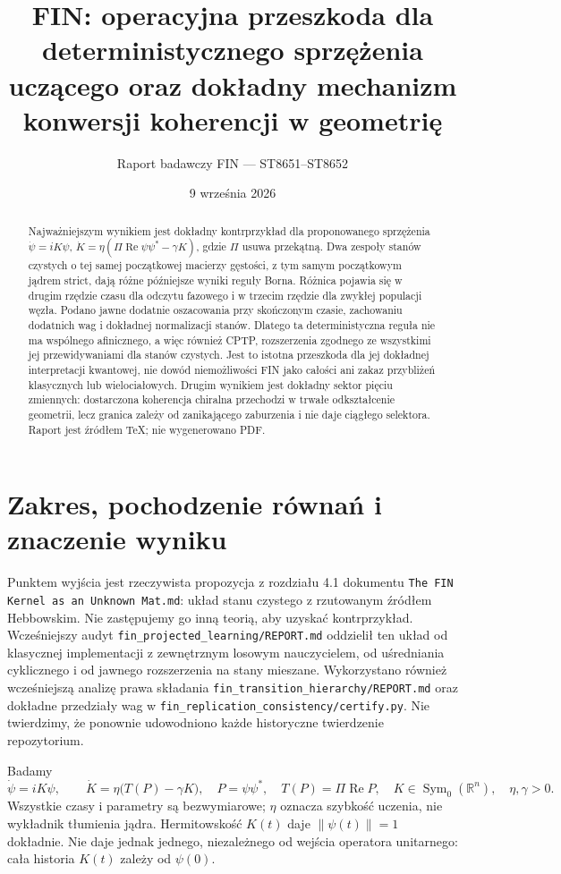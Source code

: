 \documentclass[11pt,a4paper]{article}
\title{FIN: operacyjna przeszkoda dla deterministycznego sprzężenia uczącego
oraz dokładny mechanizm konwersji koherencji w geometrię}
\author{Raport badawczy FIN --- ST8651--ST8652}
\date{9 września 2026}
\newcommand{\Rea}{\operatorname{Re}}
\newcommand{\Sym}{\operatorname{Sym}}
\begin{document}
\maketitle

\begin{abstract}
Najważniejszym wynikiem jest dokładny kontrprzykład dla proponowanego
sprzężenia $\dot\psi=iK\psi$,
$\dot K=\eta(\Pi\Rea\psi\psi^* -\gamma K)$, gdzie $\Pi$ usuwa przekątną.
Dwa zespoły stanów czystych o tej samej początkowej macierzy gęstości,
z tym samym początkowym jądrem strict, dają różne późniejsze wyniki reguły
Borna. Różnica pojawia się w drugim rzędzie czasu dla odczytu fazowego
i w trzecim rzędzie dla zwykłej populacji węzła. Podano jawne dodatnie
oszacowania przy skończonym czasie, zachowaniu dodatnich wag i dokładnej
normalizacji stanów. Dlatego ta deterministyczna reguła nie ma wspólnego
afinicznego, a więc również CPTP, rozszerzenia zgodnego ze wszystkimi
jej przewidywaniami dla stanów czystych. Jest to istotna przeszkoda dla
jej dokładnej interpretacji kwantowej, nie dowód niemożliwości FIN jako
całości ani zakaz przybliżeń klasycznych lub wielociałowych.
Drugim wynikiem jest dokładny sektor pięciu zmiennych: dostarczona
koherencja chiralna przechodzi w trwałe odkształcenie geometrii, lecz
granica zależy od zanikającego zaburzenia i nie daje ciągłego selektora.
Raport jest źródłem TeX; nie wygenerowano PDF.
\end{abstract}

\section{Zakres, pochodzenie równań i znaczenie wyniku}

Punktem wyjścia jest rzeczywista propozycja z rozdziału 4.1 dokumentu
\texttt{The FIN Kernel as an Unknown Mat.md}: układ stanu czystego
z rzutowanym źródłem Hebbowskim. Nie zastępujemy go inną teorią, aby
uzyskać kontrprzykład. Wcześniejszy audyt
\texttt{fin\_projected\_learning/REPORT.md} oddzielił ten układ od
klasycznej implementacji z zewnętrznym losowym nauczycielem, od
uśredniania cyklicznego i od jawnego rozszerzenia na stany mieszane.
Wykorzystano również wcześniejszą analizę prawa składania
\texttt{fin\_transition\_hierarchy/REPORT.md} oraz dokładne przedziały
wag w \texttt{fin\_replication\_consistency/certify.py}.
Nie twierdzimy, że ponownie udowodniono każde historyczne twierdzenie repozytorium.

Badamy
\begin{equation}\label{eq:pure}
 \dot\psi=iK\psi,\qquad
 \dot K=\eta\bigl(T(P)-\gamma K\bigr),\quad
 P=\psi\psi^*,\quad T(P)=\Pi\Rea P,
 \quad K\in\Sym_0(\mathbb R^n),\quad \eta,\gamma>0.
\end{equation}
Wszystkie czasy i parametry są bezwymiarowe; $\eta$ oznacza szybkość
uczenia, nie wykładnik tłumienia jądra. Hermitowskość $K(t)$ daje
$\|\psi(t)\|=1$ dokładnie. Nie daje jednak jednego, niezależnego od
wejścia operatora unitarnego: cała historia $K(t)$ zależy od $\psi(0)$.
\end{document}

